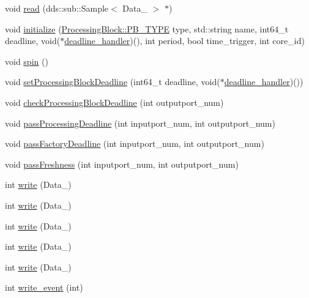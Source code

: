 \begin{DoxyCompactItemize}
\item 
void \hyperlink{classProcessingBlock_aeb371bfb05e3a32e7d0b979f946b028e}{read} (dds\+::sub\+::\+Sample$<$ Data\+\_ $>$ $\ast$)
\item 
void \hyperlink{classProcessingBlock_a799c5c29e6f0c49e1328d9781a72eb6c}{initialize} (\hyperlink{classProcessingBlock_a7101250aa8b5a80fb331ea50ddabda01}{Processing\+Block\+::\+P\+B\+\_\+\+T\+Y\+PE} type, std\+::string name, int64\+\_\+t deadline, void($\ast$\hyperlink{sample__main_8cpp_ae298e0b16475a05fd3d021c2daf90062}{deadline\+\_\+handler})(), int period, bool time\+\_\+trigger, int core\+\_\+id)
\item 
void \hyperlink{classProcessingBlock_a36e353e417f3fe482492f6166c504a71}{spin} ()
\item 
void \hyperlink{classProcessingBlock_a23b781d6f066150d0edbf4da76ada47b}{set\+Processing\+Block\+Deadline} (int64\+\_\+t deadline, void($\ast$\hyperlink{sample__main_8cpp_ae298e0b16475a05fd3d021c2daf90062}{deadline\+\_\+handler})())
\item 
void \hyperlink{classProcessingBlock_a7c23e10eabe20910e6f5d5a6bbcaff66}{check\+Processing\+Block\+Deadline} (int outputport\+\_\+num)
\item 
void \hyperlink{classProcessingBlock_acf2c086869a0543565790c8a165d0f6c}{pass\+Processing\+Deadline} (int inputport\+\_\+num, int outputport\+\_\+num)
\item 
void \hyperlink{classProcessingBlock_ac56a5637f22365288ac01a051a0bf329}{pass\+Factory\+Deadline} (int inputport\+\_\+num, int outputport\+\_\+num)
\item 
void \hyperlink{classProcessingBlock_ae6ff367237e5f91f2eab2bf2d81e182b}{pass\+Freshness} (int inputport\+\_\+num, int outputport\+\_\+num)
\item 
int \hyperlink{classProcessingBlock_a8d0f41fb6371a35583d36988e3c775a1}{write} (Data\+\_)
\item 
int \hyperlink{classProcessingBlock_a12525c442526e3a65179327eefbc285c}{write} (Data\+\_)
\item 
int \hyperlink{classProcessingBlock_aa5e4574a9c073a7168de88c052f634af}{write} (Data\+\_)
\item 
int \hyperlink{classProcessingBlock_a641e4f0b9cce71f1b8dd0a5fab6d34bb}{write} (Data\+\_)
\item 
int \hyperlink{classProcessingBlock_a7b459f5c8f5bb87f035410cdf6c81dc6}{write} (Data\+\_)
\item 
int \hyperlink{classProcessingBlock_acdbdda9a147f47eb293e258b0d04c2fc}{write\+\_\+event} (int)

\end{DoxyCompactItemize}
